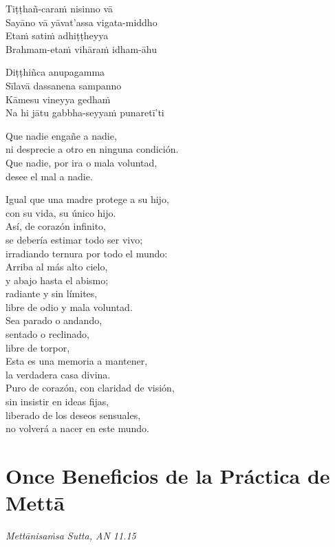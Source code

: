 Tiṭṭhañ-caraṁ nisinno vā\\
Sayāno vā yāvat'assa vigata-middho\\
Etaṁ satiṁ adhiṭṭheyya\\
Brahmam-etaṁ vihāraṁ idham-āhu

Diṭṭhiñca anupagamma\\
Sīlavā dassanena sampanno\\
Kāmesu vineyya gedhaṁ\\
Na hi jātu gabbha-seyyaṁ punaretī'ti

\clearpage

Que nadie engañe a nadie,\\
ni desprecie a otro en ninguna condición.\\
Que nadie, por ira o mala voluntad,\\
desee el mal a nadie.

Igual que una madre protege a su hijo,\\
con su vida, su único hijo.\\
Así, de corazón infinito,\\
se debería estimar todo ser vivo;\\
irradiando ternura por todo el mundo:\\
Arriba al más alto cielo,\\
y abajo hasta el abismo;\\
radiante y sin límites,\\
libre de odio y mala voluntad.\\
Sea parado o andando,\\
sentado o reclinado,\\
libre de torpor,\\
Esta es una memoria a mantener,\\
la verdadera casa divina.\\

Puro de corazón, con claridad de visión,\\
sin insistir en ideas fijas,\\
liberado de los deseos sensuales,\\
no volverá a nacer en este mundo.

\chapter[Once Beneficios]{Once Beneficios de la Práctica de Mettā}

\emph{Mettānisaṁsa Sutta, AN 11.15}


